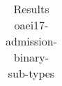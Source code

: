 \begin{table}[htb]
{\begin{tabular}[tb]{llllllllllllllllllllllllllllllllllllllll}
\end{tabular}

}

\caption{Results oaei17-admission-binary-sub-types}

\label{tbl:results}

\end{table}